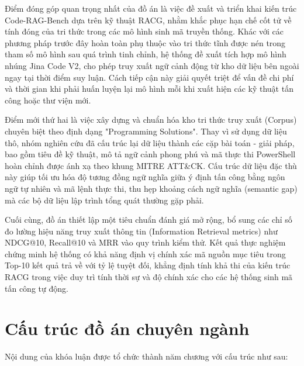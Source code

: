 Điểm đóng góp quan trọng nhất của đồ án là việc đề xuất và triển khai kiến trúc Code-RAG-Bench dựa trên kỹ thuật RACG, nhằm khắc phục hạn chế cốt tử về tính đóng của tri thức trong các mô hình sinh mã truyền thống. Khác với các phương pháp trước đây hoàn toàn phụ thuộc vào tri thức tĩnh được nén trong tham số mô hình sau quá trình tinh chỉnh, hệ thống đề xuất tích hợp mô hình nhúng Jina Code V2, cho phép truy xuất ngữ cảnh động từ kho dữ liệu bên ngoài ngay tại thời điểm suy luận. Cách tiếp cận này giải quyết triệt để vấn đề chi phí và thời gian khi phải huấn luyện lại mô hình mỗi khi xuất hiện các kỹ thuật tấn công hoặc thư viện mới.

Điểm mới thứ hai là việc xây dựng và chuẩn hóa kho tri thức truy xuất (Corpus) chuyên biệt theo định dạng "Programming Solutions". Thay vì sử dụng dữ liệu thô, nhóm nghiên cứu đã cấu trúc lại dữ liệu thành các cặp bài toán - giải pháp, bao gồm tiêu đề kỹ thuật, mô tả ngữ cảnh phong phú và mã thực thi PowerShell hoàn chỉnh được ánh xạ theo khung MITRE ATT\&CK. Cấu trúc dữ liệu đặc thù này giúp tối ưu hóa độ tương đồng ngữ nghĩa giữa ý định tấn công bằng ngôn ngữ tự nhiên và mã lệnh thực thi, thu hẹp khoảng cách ngữ nghĩa (semantic gap) mà các bộ dữ liệu lập trình tổng quát thường gặp phải.

Cuối cùng, đồ án thiết lập một tiêu chuẩn đánh giá mở rộng, bổ sung các chỉ số đo lường hiệu năng truy xuất thông tin (Information Retrieval metrics) như NDCG@10, Recall@10 và MRR vào quy trình kiểm thử. Kết quả thực nghiệm chứng minh hệ thống có khả năng định vị chính xác mã nguồn mục tiêu trong Top-10 kết quả trả về với tỷ lệ tuyệt đối, khẳng định tính khả thi của kiến trúc RACG trong việc duy trì tính thời sự và độ chính xác cho các hệ thống sinh mã tấn công tự động. 


\section{Cấu trúc đồ án chuyên ngành}

Nội dung của khóa luận được tổ chức thành năm chương với cấu trúc như sau:

